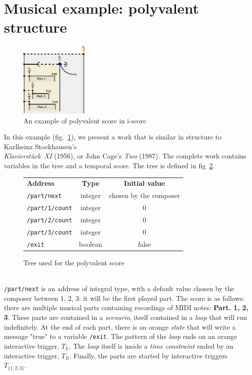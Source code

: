 \documentclass{article}
\newcommand{\scenario}{\textit{scenario}\xspace}
\newcommand{\Loop}{\textit{loop}\xspace}
\newcommand{\state}{\textit{state}\xspace}
\newcommand{\timeconstraint}{\textit{time constraint}\xspace}
\begin{document}
\section{Musical example: polyvalent structure}
\begin{figure}[h]
    \centering
    \includegraphics[width=0.30\textwidth]{images/partition.eps}
    \caption{An example of polyvalent score in i-score}
    \label{fig.polyvalent}
\end{figure}
In this example (fig.~\ref{fig.polyvalent}), we present a work that is similar in structure to Karlheinz Stockhausen's~\\ \emph{Klavierstück~XI} (1956), or John Cage's \emph{Two} (1987). 
The complete work contains variables in the tree and a temporal score.
The tree is defined in fig~\ref{fig.tablescore}.
\begin{figure}[h]
	\small
    \begin{tabular}{lcc}        
        \textbf{Address} & \textbf{Type} & \textbf{Initial value} \\
        \lstinline|/part/next|    & integer & chosen by the composer \\
        \lstinline|/part/1/count| & integer & 0 \\
        \lstinline|/part/2/count| & integer & 0 \\
        \lstinline|/part/3/count| & integer & 0 \\
        \lstinline|/exit|         & boolean & false
    \end{tabular}
    \caption{Tree used for the polyvalent score}
    \label{fig.tablescore}
\end{figure}~\\
\lstinline{/part/next} is an address of integral type, with a default value chosen by the composer between 1, 2, 3: it will be the first played part. 
The score is as follows: there are multiple musical parts containing recordings of MIDI notes: \textbf{Part. 1, 2, 3}.
These parts are contained in a \scenario, itself contained in a \Loop that will run indefinitely. 
At the end of each part, there is an orange \state that will write a message "true" to a variable \lstinline{/exit}.
The pattern of the \Loop ends on an orange interactive trigger, $T_{L}$.
The \Loop itself is inside a \timeconstraint ended by an interactive trigger, $T_{E}$.
Finally, the parts are started by interactive triggers  $T_{\{1, 2, 3\}}$.
 
\end{document}
